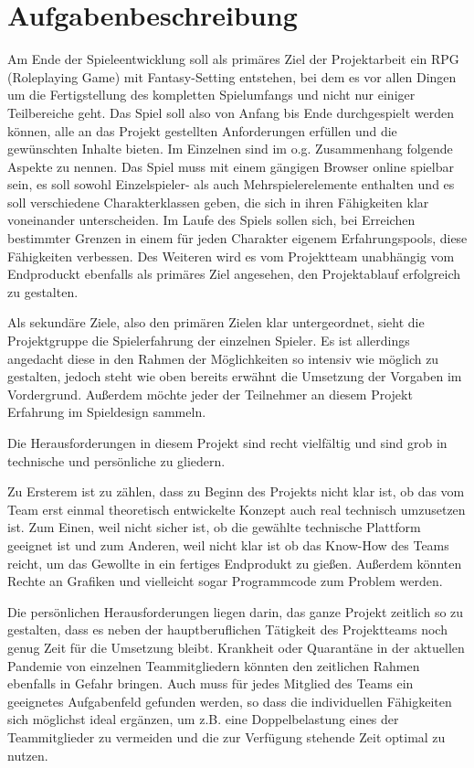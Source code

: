 

\section{Aufgabenbeschreibung}
Am Ende der Spieleentwicklung soll als primäres Ziel der Projektarbeit ein RPG (Roleplaying Game) mit Fantasy-Setting entstehen, bei dem es vor allen Dingen um die Fertigstellung des kompletten Spielumfangs und nicht nur einiger Teilbereiche geht. Das Spiel soll also von Anfang bis Ende durchgespielt werden können, alle an das Projekt gestellten Anforderungen erfüllen und die gewünschten Inhalte bieten. Im Einzelnen sind im o.g. Zusammenhang folgende Aspekte zu nennen. Das Spiel muss mit einem gängigen Browser online spielbar sein, es soll sowohl Einzelspieler- als auch Mehrspielerelemente enthalten und es soll verschiedene Charakterklassen geben, die sich in ihren Fähigkeiten klar voneinander unterscheiden. Im Laufe des Spiels sollen sich, bei Erreichen bestimmter Grenzen in einem für jeden Charakter eigenem Erfahrungspools, diese Fähigkeiten verbessen. Des Weiteren wird es vom Projektteam unabhängig vom Endproduckt ebenfalls als primäres Ziel angesehen, den Projektablauf erfolgreich zu gestalten.

Als sekundäre Ziele, also den primären Zielen klar untergeordnet, sieht die Projektgruppe die Spielerfahrung der einzelnen Spieler. Es ist allerdings angedacht diese in den Rahmen der Möglichkeiten so intensiv wie möglich zu gestalten, jedoch steht wie oben bereits erwähnt die Umsetzung der Vorgaben im Vordergrund. Außerdem möchte jeder der Teilnehmer an diesem Projekt Erfahrung im Spieldesign sammeln.

Die Herausforderungen in diesem Projekt sind recht vielfältig und sind grob in technische und persönliche zu gliedern.

Zu Ersterem ist zu zählen, dass zu Beginn des Projekts nicht klar ist, ob das vom Team erst einmal theoretisch entwickelte Konzept auch real technisch umzusetzen ist. Zum Einen, weil nicht sicher ist, ob die gewählte technische Plattform geeignet ist und zum Anderen, weil nicht klar ist ob das Know-How des Teams reicht, um das Gewollte in ein fertiges Endprodukt zu gießen. Außerdem könnten Rechte an Grafiken und vielleicht sogar Programmcode zum Problem werden.

Die persönlichen Herausforderungen liegen darin, das ganze Projekt zeitlich so zu gestalten, dass es neben der hauptberuflichen Tätigkeit des Projektteams noch genug Zeit für die Umsetzung bleibt. Krankheit oder Quarantäne in der aktuellen Pandemie von einzelnen Teammitgliedern könnten den zeitlichen Rahmen ebenfalls in Gefahr bringen. Auch muss für jedes Mitglied des Teams ein geeignetes Aufgabenfeld gefunden werden, so dass die individuellen Fähigkeiten sich möglichst ideal ergänzen, um z.B. eine Doppelbelastung eines der Teammitglieder zu vermeiden und die zur Verfügung stehende Zeit optimal zu nutzen.




